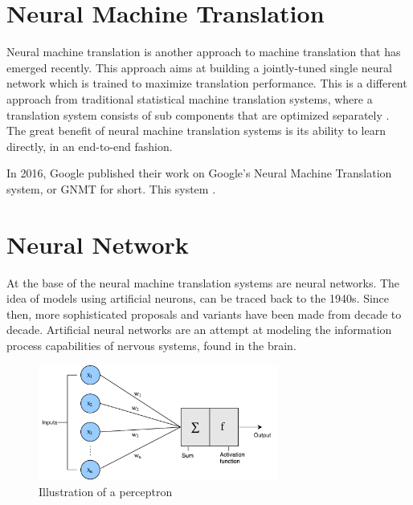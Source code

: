 
\section{Neural Machine Translation}
Neural machine translation is another approach to machine translation that has emerged recently. This approach aims at building a jointly-tuned single neural network which is trained to maximize translation performance. This is a different approach from traditional statistical machine translation systems, where a translation system consists of sub components that are optimized separately \citep{wolk2015neural}. The great benefit of neural machine translation systems is its ability to learn directly, in an end-to-end fashion. 

In 2016, Google published their work on Google's Neural Machine Translation system, or GNMT for short. This system \citep{wu2016google}.


\section{Neural Network}
At the base of the neural machine translation systems are neural networks. The idea of models using artificial neurons, can be traced back to the 1940s. Since then, more sophisticated proposals and variants have been made from decade to decade. Artificial neural networks are an attempt at modeling the information process capabilities of nervous systems, found in the brain.

\begin{figure}[ht]
    \centering
    \includegraphics[width=0.7\textwidth]{fig/related_work/nn_perceptron.pdf}
    \caption{Illustration of a perceptron}
    \label{fig:nn-perceptron}
\end{figure}

